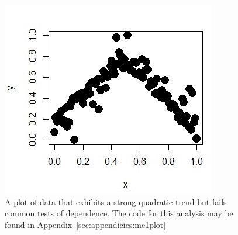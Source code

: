 \begin{figure}[htb]
	\begin{center}
		\includegraphics[width=0.5\linewidth]{ch-intro/figures/me1plot}
		\caption[A plot of data that exhibits a strong quadratic trend but fails common tests of dependence.]{A plot of data that exhibits a strong quadratic trend but fails common tests of dependence. The code for this analysis may be found in Appendix~\ref{sec:appendicies:me1plot}}
		\label{fig:intro:me1plot}
	\end{center}
\end{figure}